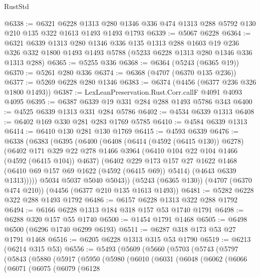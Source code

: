 \begin{lexlean}{RustStd}
\begin{coremodule}
@6338 := @6321
    @6228
    @1313
    @280
    @1346
    @336
    @474
    @1313
    @288
    @5792
    @130
    @210
    @135
    @322
    @1613
    @1493
    @1493
    @1793
@6339 := @5067 @6228
@6364 := @6321
    @6339
    @1313
    @280
    @1346
    @336
    @135
    @1313
    @288
    @1603
    @19
    @236
    @326
    @332
    @1800
    @1493
    @1493
    @5788
    (@5233 @6228 @1313 @280 @1346 @336 @1313 @288)
@6365 := @5255 @336
@6368 := @6364 (@5243 (@6365 @19))
@6370 := @5261 @280 @336
@6374 := @6368 (@4707 (@6370 @135 @236))
@6377 := @5269 @6228 @280 @1346
@6383 := @6374 (@4456 (@6377 @236 @326 @1800 @1493))
@6387 := LexLeanPreservation.Rust.Corr.callF @4091 @4093 @4095
@6395 := @6387 @6339 @19 @331 @284 @288 @1493 @5786 @343
@6400 := @4525 @6339 @1313 @331 @284 @5786
@6402 := @4534 @6339 @1313
@6408 := @6402 @169 @330 @281 @283 @1769 @5785
@6410 := @4584 @6339 @1313
@6414 := @6410 @130 @281 @130 @1769
@6415 := @4593 @6339
@6476 := @6338
    (@6383
      (@6395
        (@6400
          (@6408
            (@6414 (@4592 (@6415 @130)) @6278)
            (@6402
              @171
              @329
              @22
              @278
              @1466
              @3964
              (@6410 @104 @22 @104 @1466 (@4592 (@6415 @104)) @4637)
              (@6402
                @229
                @173
                @157
                @27
                @1622
                @1468
                (@6410 @69 @157 @69 @1622 (@4592 (@6415 @69)) @5414)
                (@4643 @6339 @1313)))))
        @5034
        @5037
        @5040
        @5043))
    (@5243 (@6365 @130))
    (@4707 (@6370 @474 @210))
    (@4456 (@6377 @210 @135 @1613 @1493))
@6481 := @5282 @6228 @322 @288 @1493 @1792
@6486 := @6157 @6228 @1313 @322 @288 @1792
@6494 := @6166 @6228 @1313 @184 @318 @157 @53 @1740 @1791
@6498 := @6288 @320 @157 @55 @1740
@6500 := @1454 @1791 @1468
@6505 := @6498 @6500 (@6296 @1740 @6299 @6193)
@6511 := @6287 @318 @173 @53 @27 @1791 @1468
@6516 := @6205 @6228 @1313 @315 @53 @1790
@6519 := @6213 (@6214 @315 @53)
@6556 := @5493
    (@5609
      (@5660
        (@5703
          (@5743
            (@5797
              (@5843
                (@5880
                  (@5917
                    (@5950
                      (@5980
                        (@6010
                          (@6031
                            (@6048
                              (@6062
                                (@6066
                                  (@6071
                                    (@6075
                                      (@6079
                                        (@6128

\end{coremodule}
\end{lexlean}
